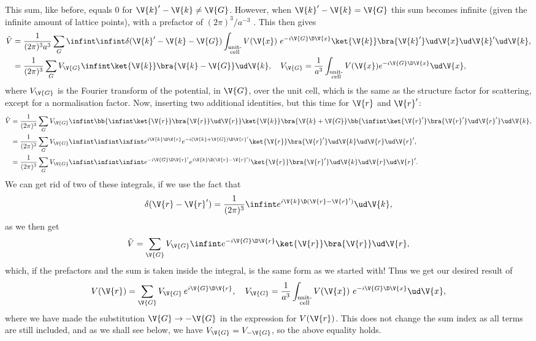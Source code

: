 \documentclass[main.tex]{subfiles}
\begin{document}
	This sum, like before, equals 0 for $ \V{k}'-\V{k} \neq \V{G} $. However, when $ \V{k}'-\V{k} = \V{G} $ this sum becomes infinite (given the infinite amount of lattice points), with a prefactor of $ (2\pi)^3 / a^{-3} $ \cite{simon}. This then gives
	\begin{align}
		\hat{V} &= \frac{1}{(2\pi)^3 a^3} \sum_{G} \infint \infint \delta(\V{k}'-\V{k}-\V{G}) \int_{\substack{\text{unit-} \\\text{cell}}} V(\V{x})\  e^{-i \V{G} \D \V{x}} \ket{\V{k}} \bra{\V{k}'} \ud \V{x} \ud\V{k}'   \ud\V{k}, \\
		&= \frac{1}{(2\pi)^3 } \sum_{G} V_{\V{G}}  \infint \ket{\V{k}} \bra{\V{k}-\V{G}} \ud \V{k}, \quad V_{\V{G}} = \frac{1}{a^3} \int_{\substack{\text{unit-} \\\text{cell}}} V(\V{x}) e^{-i\V{G} \D \V{x}} \ud \V{x},
	\end{align}
	where $ V_{\V{G}} $ is the Fourier transform of the potential, in $ \V{G} $, over the unit cell, which is the same as the structure factor for scattering, except for a normalisation factor. Now, inserting two additional identities, but this time for $ \V{r} $ and $ \V{r}' $:
	\begin{align}
		\hat{V} &= \frac{1}{(2\pi)^3 }\sum_{G}  V_{\V{G}} \infint \bb{\infint \ket{\V{r}} \bra{\V{r}} \ud \V{r}} \ket{\V{k}} \bra{\V{k}+ \V{G}} \bb{\infint \ket{\V{r}'} \bra{\V{r}'} \ud \V{r}'} \ud \V{k}, \\
		&= \frac{1}{(2\pi)^3} \sum_{G} V_{\V{G}} \infint  \infint \infint e^{i \V{k} \D \V{r}} e^{-i (\V{k}+\V{G}) \D \V{r}'} \ket{\V{r}} \bra{\V{r}'} \ud \V{k} \ud \V{r} \ud \V{r}', \\
		&=\frac{1}{(2\pi)^3} \sum_{G} V_{\V{G}} \infint \infint \infint  e^{-i \V{G} \D \V{r}'} e^{i \V{k} \D (\V{r}-\V{r}')} \ket{\V{r}} \bra{\V{r}'} \ud \V{k} \ud \V{r} \ud \V{r}'.
	\end{align}
	We can get rid of two of these integrals, if we use the fact that \cite{riley}
	\begin{equation} \label{eq:delta_funct}
		\delta(\V{r}-\V{r}') = \frac{1}{(2\pi)^3} \infint  e^{i \V{k} \D (\V{r}-\V{r}')} \ud \V{k},
	\end{equation}
	as we then get
	\begin{equation}
		\hat{V} = \sum_{\V{G}} V_{\V{G}} \infint e^{-i \V{G} \D \V{r}} \ket{\V{r}} \bra{\V{r}} \ud \V{r},
	\end{equation}
	which, if the prefactors and the sum is taken inside the integral, is the same form as we started with! Thus we get our desired result of
	\begin{equation}
		V(\V{r}) =  \sum_{\V{G}} V_{\V{G}} \,e^{i \V{G} \D \V{r}}, \quad V_{\V{G}} = \frac{1}{a^3} \int_{\substack{\text{unit-} \\\text{cell}}}  V(\V{x})\  e^{-i \V{G} \D \V{x}} \ud \V{x},
	\end{equation}
	where we have made the substitution $ \V{G} \to -\V{G} $ in the expression for $ V(\V{r}) $. This does not change the sum index as all terms are still included, and as we shall see below, we have $ V_{\V{G}}= V_{-\V{G}} $, so the above equality holds.
	
\end{document}
